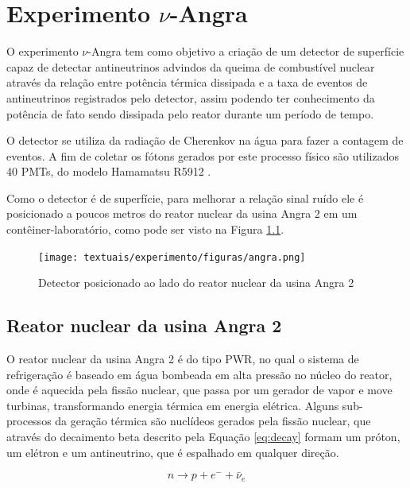 \chapter{Experimento $\nu$-Angra}\label{cap:experimento}
\vspace{-2cm}

O experimento $\nu$-Angra tem como objetivo a criação de um detector de superfície capaz de detectar antineutrinos advindos da queima de combustível nuclear através da relação entre potência térmica dissipada e a taxa de eventos de antineutrinos registrados pelo detector, assim podendo ter conhecimento da potência de fato sendo dissipada pelo reator durante um período de tempo.

O detector se utiliza da radiação de Cherenkov na água para fazer a contagem de eventos. A fim de coletar os fótons gerados por este processo físico são utilizados 40 PMTs, do modelo Hamamatsu R5912 \cite{hamamatsu1998photomultiplier}.

Como o detector é de superfície, para melhorar a relação sinal ruído ele é posicionado a poucos metros do reator nuclear da usina Angra 2 em um contêiner-laboratório, como pode ser visto na Figura \ref{fig:angra}.

\begin{figure}[H]
	\centering
	\texttt{[image: textuais/experimento/figuras/angra.png]}
	\caption{Detector posicionado ao lado do reator nuclear da usina Angra 2}
	\label{fig:angra}
\end{figure}

\section{Reator nuclear da usina Angra 2}

O reator nuclear da usina Angra 2 é do tipo \ac{PWR}, no qual o sistema de refrigeração é baseado em água bombeada em alta pressão no núcleo do reator, onde é aquecida pela fissão nuclear, que passa por um gerador de vapor e move turbinas, transformando energia térmica em energia elétrica. Alguns sub-processos da geração térmica são nuclídeos gerados pela fissão nuclear, que através do decaimento beta descrito pela Equação \ref{eq:decay} formam um próton, um elétron e um antineutrino, que é espalhado em qualquer direção.

\begin{equation}
n \rightarrow p + e^- + \bar{\nu}_e 
\label{eq:decay}
\end{equation}

